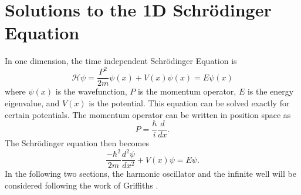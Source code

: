 \chapter{Solutions to the 1D Schr\"odinger Equation} \label{section:appendixA}
In one dimension, the time independent Schr\"odinger Equation is
\begin{equation}
    \mathcal{H}\psi=\frac{P^2}{2m}\psi(x)+V(x)\psi(x)=E\psi(x)
\end{equation}
where $\psi(x)$ is the wavefunction, $P$ is the momentum operator, $E$ is the energy eigenvalue, and $V(x)$ is the potential. This equation can be solved exactly for certain potentials. The momentum operator can be written in position space as 
\begin{equation}
P=\frac{\hbar}{i}\frac{d}{dx}.
\end{equation}
The Schr\"odinger equation then becomes
\begin{equation}
    \frac{-\hbar^2}{2m}\frac{d^2 \psi}{dx^2} + V(x) \psi=E\psi.
\end{equation}
In the following two sections, the harmonic oscillator and the infinite well will be considered following the work of Griffiths \cite{Griffiths}.
